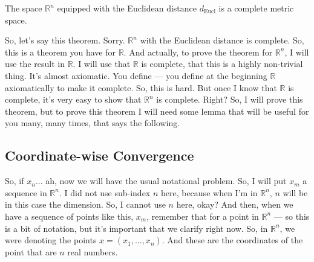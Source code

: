 \begin{nice-box}
\begin{theorem}\label{thm:rn-complete}
The space $\mathbb{R}^n$ equipped with the Euclidean distance $d_{\text{Eucl}}$ is a complete metric space.
\end{theorem}
\end{nice-box}

\begin{spoken-clean}[00:11:08 - 00:12:38]
So, let's say this theorem.  Sorry. $\mathbb{R}^n$ with the Euclidean distance is complete. So, this is a theorem you have for $\mathbb{R}$. And actually, to prove the theorem for $\mathbb{R}^n$, I will use the result in $\mathbb{R}$. I will use that $\mathbb{R}$ is complete, that this is a highly non-trivial thing. It's almost axiomatic. You define --- you define at the beginning $\mathbb{R}$ axiomatically to make it complete. So, this is hard. But once I know that $\mathbb{R}$ is complete, it's very easy to show that $\mathbb{R}^n$ is complete. Right? So, I will prove this theorem, but to prove this theorem I will need some lemma that will be useful for you many, many times, that says the following.
\end{spoken-clean}


\subsection{Coordinate-wise Convergence}

\begin{spoken-clean}[00:12:38 - 00:14:12]
So, if $x_n$... ah, now we will have the usual notational problem. So, I will put $x_m$  a sequence in $\mathbb{R}^n$. I did not use sub-index $n$ here, because when I'm in $\mathbb{R}^n$, $n$ will be in this case the dimension. So, I cannot use $n$ here, okay? And then, when we have a sequence of points like this, $x_m$, remember that for a point in $\mathbb{R}^n$ --- so this is a bit of notation, but it's important that we clarify right now. So, in $\mathbb{R}^n$, we were denoting the points $x = (x_1, \dots, x_n)$. And these are the coordinates of the point that are $n$ real numbers.
\end{spoken-clean}


